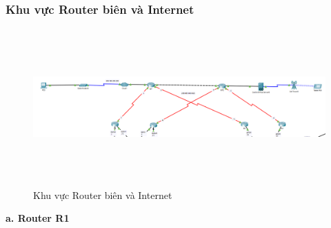 \documentclass[a4paper, 12pt]{article}
\begin{document}
\subsubsection{Khu vực Router biên và Internet}
\begin{figure}[H]
    \centering
    \includegraphics[width=16cm, height=6cm]{img/router.png}
    \caption{Khu vực Router biên và Internet}
    \label{hinh41}
\end{figure}
\hspace*{1cm}\textbf{a. Router R1} \\
\end{document}
